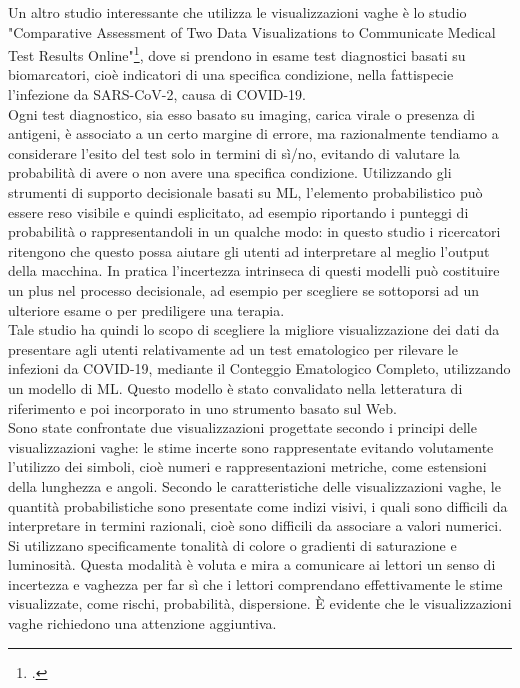 Un altro studio interessante che utilizza le visualizzazioni vaghe è lo studio "Comparative Assessment of Two Data Visualizations to Communicate Medical Test Results Online"\footcite{womak:comparative-assesment}, dove si prendono in esame test diagnostici basati su biomarcatori, cioè indicatori di una specifica condizione, nella fattispecie l'infezione da SARS-CoV-2, causa di COVID-19.\\
Ogni test diagnostico, sia esso basato su imaging, carica virale o presenza di antigeni, è associato a un certo margine di errore, ma razionalmente tendiamo a considerare l'esito del test solo in termini di sì/no, evitando di valutare la probabilità di avere o non avere una specifica condizione. Utilizzando gli strumenti di supporto decisionale basati su ML, l'elemento probabilistico può essere reso visibile e quindi esplicitato, ad esempio riportando i punteggi di probabilità o rappresentandoli in un qualche modo: in questo studio i ricercatori ritengono che questo possa aiutare gli utenti ad interpretare al meglio l'output della macchina. In pratica l'incertezza intrinseca di questi modelli può costituire un plus nel processo decisionale, ad esempio per scegliere se sottoporsi ad un ulteriore esame o per prediligere una terapia.\\
Tale studio ha quindi lo scopo di scegliere la migliore visualizzazione dei dati da presentare agli utenti relativamente ad un test ematologico per rilevare le infezioni da COVID-19, mediante il Conteggio Ematologico Completo, utilizzando un modello di ML. Questo modello è stato convalidato nella letteratura di riferimento e poi incorporato in uno strumento basato sul Web.\\
Sono state confrontate due visualizzazioni progettate secondo i principi delle visualizzazioni vaghe: le stime incerte sono rappresentate evitando volutamente l'utilizzo dei simboli, cioè numeri e rappresentazioni metriche, come estensioni della lunghezza e angoli. Secondo le caratteristiche delle visualizzazioni vaghe, le quantità probabilistiche sono presentate come indizi visivi, i quali sono difficili da interpretare in termini razionali, cioè sono difficili da associare a valori numerici. Si utilizzano specificamente tonalità di colore o gradienti di saturazione e luminosità. Questa modalità è voluta e mira a comunicare ai lettori un senso di incertezza e vaghezza per far sì che i lettori comprendano effettivamente le stime visualizzate, come rischi, probabilità, dispersione. È evidente che le visualizzazioni vaghe richiedono una attenzione aggiuntiva.\\

